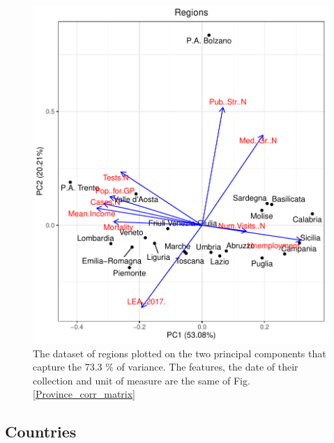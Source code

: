\documentclass[
12pt, %
a4paper, %
oneside, %
headinclude,footinclude, %
BCOR5mm, %
]{scrartcl}
\begin{document}
\begin{figure}[h]
\begin{center}
\includegraphics[scale=1]{Pic/Regions_FULL_PCA.pdf}
\caption{The dataset of regions plotted on the two principal components that capture the 73.3 $\% $ of variance. The features, the date of their collection and unit of measure are the same of Fig. \ref{Province_corr_matrix}}
\label{Regions_FULL_PCA}
\end{center}
\end{figure}


\clearpage

\subsection{Countries}
\end{document}
